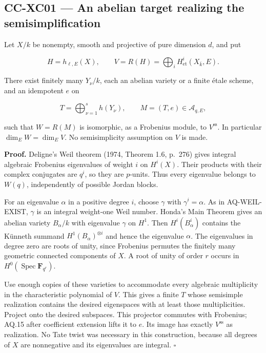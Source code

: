 \documentclass[11pt,a4paper]{article}
\theoremstyle{definition}\newtheorem{definition}[theorem]{Definition}
\theoremstyle{remark}\newtheorem{remark}[theorem]{Remark}
\begin{document}
\subsection{CC-XC01 --- An abelian target realizing the
semisimplification}\label{cc-xc01-an-abelian-target-realizing-the-semisimplification}

Let \(X/k\) be nonempty, smooth and projective of pure dimension \(d\),
and put

\[
 H=h_{\ell,E}(X),\qquad V=R(H)=\bigoplus_i H^i_{\mathrm{et}}(X_{\bar k},E).
\]

There exist finitely many \(Y_\nu/k\), each an abelian variety or a
finite étale scheme, and an idempotent \(e\) on

\[
 T=\bigoplus_{\nu=1}^s h(Y_\nu),\qquad M=(T,e)\in\mathcal A_{q,E},
\]

such that \(W=R(M)\) is isomorphic, as a Frobenius module, to
\(V^{\mathrm{ss}}\). In particular \(\dim_E W=\dim_E V\). No
semisimplicity assumption on \(V\) is made.

\textbf{Proof.} Deligne's Weil theorem (1974, Theorem 1.6, p.~276) gives
integral algebraic Frobenius eigenvalues of weight \(i\) on \(H^i(X)\).
Their products with their complex conjugates are \(q^i\), so they are
\(p\)-units. Thus every eigenvalue belongs to \(W(q)\), independently of
possible Jordan blocks.

For an eigenvalue \(\alpha\) in a positive degree \(i\), choose
\(\gamma\) with \(\gamma^i=\alpha\). As in AQ-WEIL-EXIST, \(\gamma\) is
an integral weight-one Weil number. Honda's Main Theorem gives an
abelian variety \(B_\alpha/k\) with eigenvalue \(\gamma\) on \(H^1\).
Then \(H^i(B_\alpha^i)\) contains the Künneth summand
\(H^1(B_\alpha)^{\otimes i}\) and hence the eigenvalue \(\alpha\). The
eigenvalues in degree zero are roots of unity, since Frobenius permutes
the finitely many geometric connected components of \(X\). A root of
unity of order \(r\) occurs in
\(H^0(\operatorname{Spec}\mathbf F_{q^r})\).

Use enough copies of these varieties to accommodate every algebraic
multiplicity in the characteristic polynomial of \(V\). This gives a
finite \(T\) whose semisimple realization contains the desired
eigenspaces with at least those multiplicities. Project onto the desired
subspaces. This projector commutes with Frobenius; AQ.15 after
coefficient extension lifts it to \(e\). Its image has exactly
\(V^{\mathrm{ss}}\) as realization. No Tate twist was necessary in this
construction, because all degrees of \(X\) are nonnegative and its
eigenvalues are integral. \(\square\)
\end{document}
